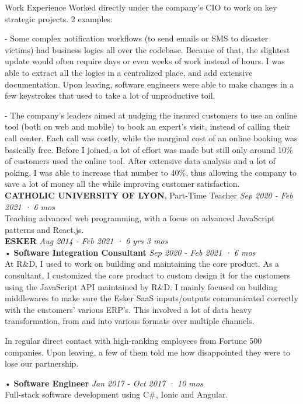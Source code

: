 \documentclass{resume} %
\begin{document}
\begin{rSection}{Work Experience}
Worked directly under the company's CIO to work on key strategic projects. 2 examples:

- Some complex notification workflows (to send emails or SMS to disaster victims) had business logics all over the codebase. Because of that, the slightest update would often require days or even weeks of work instead of hours. I was able to extract all the logics in a centralized place, and add extensive documentation. Upon leaving, software engineers were able to make changes in a few keystrokes that used to take a lot of unproductive toil.

- The company's leaders aimed at nudging the insured customers to use an online tool (both on web and mobile) to book an expert's visit, instead of calling their call center. Each call was costly, while the marginal cost of an online booking was basically free. Before I joined, a lot of effort was made but still only around 10\% of customers used the online tool. After extensive data analysis and a lot of poking, I was able to increase that number to 40\%, thus allowing the company to save a lot of money all the while improving customer satisfaction.\\

{\bf CATHOLIC UNIVERSITY OF LYON}{, Part-Time Teacher} \hfill {\em Sep 2020 - Feb 2021 · 6 mos}\\
Teaching advanced web programming, with a focus on advanced JavaScript patterns and React.js.\\

{\bf ESKER} \hfill {\em Aug 2014 - Feb 2021 · 6 yrs 3 mos}\\
• {\bf Software Integration Consultant} \hfill {\em Sep 2020 - Feb 2021 · 6 mos}\\
At R\&D, I used to work on building and maintaining the core product. As a consultant, I customized the core product to custom design it for the customers using the JavaScript API maintained by R\&D. I mainly focused on building middlewares to make sure the Esker SaaS inputs/outputs communicated correctly with the customers' various ERP's. This involved a lot of data heavy transformation, from and into various formats over multiple channels.

In regular direct contact with high-ranking employees from Fortune 500 companies. Upon leaving, a few of them told me how disappointed they were to lose our partnership.

• {\bf Software Engineer} \hfill {\em Jan 2017 - Oct 2017 · 10 mos}\\
Full-stack software development using C\#, Ionic and Angular.


\end{rSection}
\end{document}
